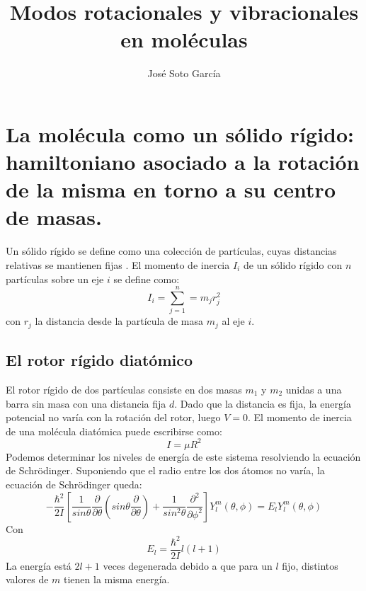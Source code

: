 \documentclass[a4paper]{article}
\title{Modos rotacionales y vibracionales en moléculas}
\author{José Soto García}
\begin{document}
\maketitle
\section{La molécula como un sólido rígido: hamiltoniano asociado a la rotación de la misma en torno a su centro de masas.}
Un sólido rígido se define como una colección de partículas, cuyas distancias relativas se mantienen fijas \cite{marion2013}. El momento de inercia $I_i$ de un sólido rígido con $n$ partículas sobre un eje $i$ se define como:
\begin{equation}
I_i= \sum_{j=1}^n=m_jr_j^2
\end{equation}
con $r_j$ la distancia desde la partícula de masa $m_j$ al eje $i$.

\subsection{El rotor rígido diatómico}
El rotor rígido de dos partículas consiste en dos masas $m_1$ y $m_2$ unidas a una barra sin masa con una distancia fija $d$. Dado que la distancia es fija, la energía potencial no varía con la rotación del rotor, luego $V=0$. \cite{levine1980} El momento de inercia de una molécula diatómica puede escribirse como:
\begin{equation}
I=\mu R^2
\end{equation}
Podemos determinar los niveles de energía de este sistema resolviendo la ecuación de Schrödinger. Suponiendo que el radio entre los dos átomos no varía, la ecuación de Schrödinger queda:
\begin{equation}
- \frac{\hbar^2}{2I}\left[\frac{1}{sin\theta}\frac{\partial}{\partial \theta}\left(sin\theta \frac{\partial}{\partial \theta} \right) + \frac{1}{sin^2\theta}\frac{\partial^2}{\partial \phi^2}\right]Y^m_l \left(\theta,\phi \right) = E_lY^m_l \left(\theta,\phi \right)
\end{equation}
Con
$$E_l= \frac{\hbar^2}{2I}l(l+1)$$
La energía está $2l+1$ veces degenerada debido a que para un $l$ fijo, distintos valores de $m$ tienen la misma energía.
\end{document}
